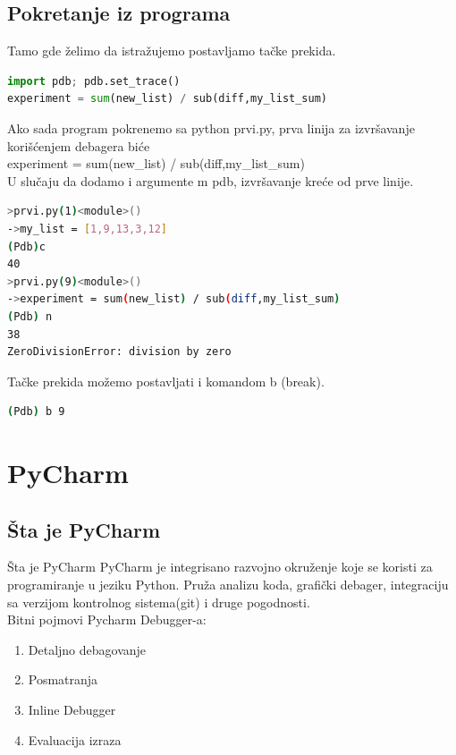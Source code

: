 \documentclass{beamer}
\begin{document}
\subsection{Pokretanje iz programa}
\begin{frame}[fragile]
Tamo gde želimo da istražujemo postavljamo tačke prekida.
\begin{lstlisting}[language = python]
import pdb; pdb.set_trace()
experiment = sum(new_list) / sub(diff,my_list_sum)
\end{lstlisting}
Ako sada program pokrenemo sa {\color{blue}python prvi.py}, prva linija za izvršavanje korišćenjem debagera biće \\{\color{blue}experiment = sum(new\_list) / sub(diff,my\_list\_sum)} \\ U slučaju da dodamo i argumente {\color{blue}\textendash m  pdb}, izvršavanje kreće od prve linije.
\begin{lstlisting}[language = bash]
>prvi.py(1)<module>()
->my_list = [1,9,13,3,12]
(Pdb)c
40
>prvi.py(9)<module>()
->experiment = sum(new_list) / sub(diff,my_list_sum)
(Pdb) n
38
ZeroDivisionError: division by zero
\end{lstlisting}
Tačke prekida možemo postavljati i komandom b (break).  
\begin{lstlisting}[language = bash]
(Pdb) b 9 
\end{lstlisting}

\end{frame}   


\section{PyCharm}
\subsection{Šta je PyCharm}
\begin{frame}{Šta je PyCharm}
PyCharm je integrisano razvojno okruženje koje se koristi za programiranje u jeziku Python. Pruža analizu koda, grafički debager, integraciju sa verzijom kontrolnog sistema(git) i druge pogodnosti.\\
Bitni pojmovi Pycharm Debugger-a:
\begin{enumerate}
    \item Detaljno debagovanje
    \item Posmatranja
    \item Inline Debugger
    \item Evaluacija izraza
\end{enumerate}
\end{frame}
\end{document}
